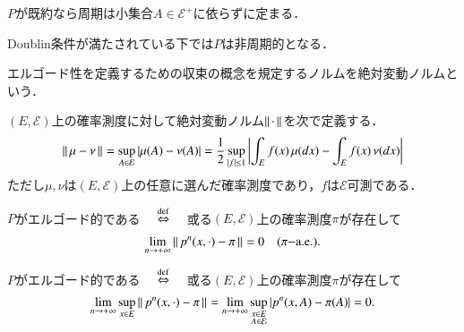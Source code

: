 	\begin{prp}[周期の一意性]
		$P$が既約なら周期は小集合$A \in \mathcal{E}^+$に依らずに定まる．
	\end{prp}
	\begin{prp}
		Doublin条件が満たされている下では$P$は非周期的となる．
	\end{prp}
	
	エルゴード性を定義するための収束の概念を規定するノルムを絶対変動ノルムという．
	\begin{dfn}[絶対変動ノルム]
		$(E,\mathcal{E})$上の確率測度に対して絶対変動ノルム$\left\|\, \cdot\, \right\|_{}$を次で定義する．
		\begin{align}
			\left\|\, \mu - \nu\, \right\|_{} = \operatorname*{sup}_{A \in \mathcal{E}} |\mu(A) - \nu(A)| = \frac{1}{2} \operatorname*{sup}_{|f| \leq 1} \left|\int_E f(x)\, \mu(dx) - \int_E f(x)\, \nu(dx)\right|
		\end{align}
		ただし$\mu,\nu$は$(E,\mathcal{E})$上の任意に選んだ確率測度であり，$f$は$\mathcal{E}$可測である．
	\end{dfn}
	
	\begin{dfn}[エルゴード性]
		$P$がエルゴード的である $\quad \overset{\mathrm{def}}{\Leftrightarrow} \quad$ 或る$(E,\mathcal{E})$上の確率測度$\pi$が存在して
		\begin{align}
			\lim_{n \to +\infty} \left\|\, p^n(x,\cdot) - \pi\, \right\|_{} = 0 \quad (\pi \rm{-a.e.}).
		\end{align}
	\end{dfn}
	
	\begin{dfn}[一様エルゴード性]
		$P$がエルゴード的である $\quad \overset{\mathrm{def}}{\Leftrightarrow} \quad$ 或る$(E,\mathcal{E})$上の確率測度$\pi$が存在して
		\begin{align}
			\lim_{n \to +\infty} \operatorname*{sup}_{x \in E} \left\|\, p^n(x,\cdot) - \pi\, \right\|_{} = \lim_{n \to +\infty} \operatorname*{sup}_{\substack{x \in E \\ A \in \mathcal{E}}} \left| p^n(x,A) - \pi(A)\right| =0.
		\end{align}
	\end{dfn}
	
	
	
	
	
	
	
	
	
	